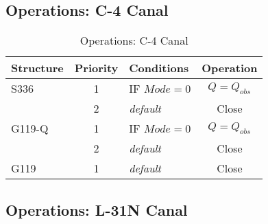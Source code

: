 \subsection{Operations: C-4 Canal}

\scriptsize
\begin{table}[!h]
\centering
\caption{Operations: C-4 Canal}
\label{tab:M11opsC4}
\begin{tabular}{|l|c|l|c|c|}
\hline
\textbf{Structure} & \textbf{Priority}  & \textbf{Conditions} & \multicolumn{2}{|c|}{\textbf{Operation}}   \\
\hline
\hline
S336          &  1  & IF $Mode=0$                   & \multicolumn{2}{|c|}{$Q = Q_{obs}$}   \\
\hline
              &  2  & \it{default}                  & \multicolumn{2}{|c|}{Close}           \\
\hline
G119-Q        &  1  & IF $Mode=0$                   & \multicolumn{2}{|c|}{$Q = Q_{obs}$}   \\
\hline
              &  2  & \it{default}                  & \multicolumn{2}{|c|}{Close}           \\
\hline
G119          &  1  & \it{default}                  & \multicolumn{2}{|c|}{Close}           \\
\hline
\hline
\end{tabular}
\end{table}
\normalsize

\clearpage

\subsection{Operations: L-31N Canal}

